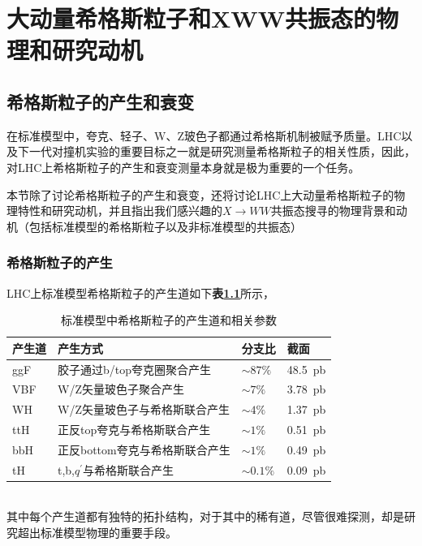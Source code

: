 \chapter{大动量希格斯粒子和XWW共振态的物理和研究动机}
\label{chap2}
\fontsize{12bp}{14.4pt}

\section{希格斯粒子的产生和衰变}
在标准模型中，夸克、轻子、W、Z玻色子都通过希格斯机制被赋予质量。LHC以及下一代对撞机实验的重要目标之一就是研究测量希格斯粒子的相关性质，因此，对LHC上希格斯粒子的产生和衰变测量本身就是极为重要的一个任务。

本节除了讨论希格斯粒子的产生和衰变，还将讨论LHC上大动量希格斯粒子的物理特性和研究动机，并且指出我们感兴趣的$X\to WW$共振态搜寻的物理背景和动机（包括标准模型的希格斯粒子以及非标准模型的共振态）
\subsection{希格斯粒子的产生}
LHC上标准模型希格斯粒子的产生道如下\textbf{表\ref{table:2.1}}所示，
\begin{table}[htbp]
    \caption{标准模型中希格斯粒子的产生道和相关参数\cite{Higgs_cross_sections}}\label{table:2.1}
    \centering
    \begin{tabular}{>{\centering\arraybackslash}p{2cm}%
    >{\centering\arraybackslash}p{7cm}%
    >{\centering\arraybackslash}p{2cm}%
    >{\centering\arraybackslash}p{2cm}}
    \toprule\toprule
    \textbf{产生道} & \textbf{产生方式} & \textbf{分支比} & \textbf{截面}\\
    \midrule
    ggF & 胶子通过b/top夸克圈聚合产生 & $\sim 87\%$ & \SI{48.5}{pb}\\
    VBF & W/Z矢量玻色子聚合产生 & $\sim7\%$ & \SI{3.78}{pb}\\
    WH & W/Z矢量玻色子与希格斯联合产生 & $\sim 4\%$ & \SI{1.37}{pb}\\
    ttH & 正反top夸克与希格斯联合产生 & $\sim1\%$ & \SI{0.51}{pb}\\
    bbH & 正反bottom夸克与希格斯联合产生 &  $\sim 1\%$ & \SI{0.49}{pb}\\
    tH & t,b,$q^\prime$与希格斯联合产生 & $\sim 0.1\%$ & \SI{0.09}{pb}\\
    \bottomrule\bottomrule
\end{tabular}
\end{table}\\
其中每个产生道都有独特的拓扑结构，对于其中的稀有道，尽管很难探测，却是研究超出标准模型物理的重要手段。

